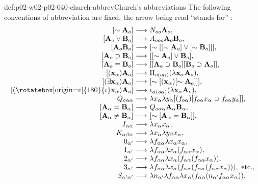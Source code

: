 \begin{hbdefinition}{def:p02-w02-p02-040-church-abbrev}{Church's abbreviations}
The following conventions of abbreviation are fixed, the arrow being read
``stands for'' \cite[\S2, p.~58]{Church1940}:
\[
\begin{array}{r@{\ \longrightarrow\ }l}
 [\sim\mathbf A_o] & N_{oo}\mathbf A_o,\\
 {}[\mathbf A_o\vee\mathbf B_o] & A_{ooo}\mathbf A_o\mathbf B_o,\\
 {}[\mathbf A_o\mathbf B_o] & [\sim[[\sim\mathbf A_o]\vee[\sim\mathbf B_o]]],\\
 {}[\mathbf A_o\supset\mathbf B_o] & [[\sim\mathbf A_o]\vee\mathbf B_o],\\
 {}[\mathbf A_o\equiv\mathbf B_o] & [[\mathbf A_o\supset\mathbf B_o][\mathbf B_o\supset\mathbf A_o]],\\
 {}[(\mathbf x_\alpha)\mathbf A_o] & \Pi_{o(o\alpha)}(\lambda\mathbf x_\alpha\mathbf A_o),\\
 {}[(\exists\mathbf x_\alpha)\mathbf A_o] & [\sim[(\mathbf x_\alpha)[\sim\mathbf A_o]]],\\
 {}[(\text{\rotatebox[origin=c]{180}{\(\iota\)}}\mathbf x_\alpha)\mathbf A_o] & \iota_{\alpha(o\alpha)}(\lambda\mathbf x_\alpha\mathbf A_o),\\
 Q_{o\alpha\alpha} & \lambda x_\alpha\lambda y_\alpha[(f_{o\alpha})[f_{o\alpha}x_\alpha\supset f_{o\alpha}y_\alpha]],\\
 {}[\mathbf A_\alpha=\mathbf B_\alpha] & Q_{o\alpha\alpha}\mathbf A_\alpha\mathbf B_\alpha,\\
 {}[\mathbf A_\alpha\neq\mathbf B_\alpha] & [\sim[\mathbf A_\alpha=\mathbf B_\alpha]],\\
 I_{\alpha\alpha} & \lambda x_\alpha x_\alpha,\\
 K_{\alpha\beta\alpha} & \lambda x_\alpha\lambda y_\beta x_\alpha,\\
 0_{\alpha'} & \lambda f_{\alpha\alpha}\lambda x_\alpha x_\alpha,\\
 1_{\alpha'} & \lambda f_{\alpha\alpha}\lambda x_\alpha(f_{\alpha\alpha}x_\alpha),\\
 2_{\alpha'} & \lambda f_{\alpha\alpha}\lambda x_\alpha(f_{\alpha\alpha}(f_{\alpha\alpha}x_\alpha)),\\
 3_{\alpha'} & \lambda f_{\alpha\alpha}\lambda x_\alpha(f_{\alpha\alpha}(f_{\alpha\alpha}(f_{\alpha\alpha}x_\alpha))),\ \text{etc.},\\
 S_{\alpha'\alpha'} & \lambda n_{\alpha'}\lambda f_{\alpha\alpha}\lambda x_\alpha(f_{\alpha\alpha}(n_{\alpha'}f_{\alpha\alpha}x_\alpha)),\\

\end{array}\]
\end{hbdefinition}
